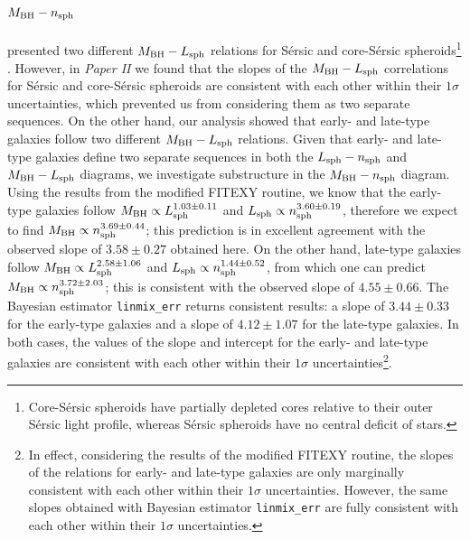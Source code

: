 \documentclass[preprint2]{emulateapj}
\begin{document}
\subsection{$M_{\rm BH} - n_{\rm sph}$}
\cite{grahamscott2013} presented two different $M_{\rm BH} - L_{\rm sph}$ relations for S\'ersic and core-S\'ersic 
spheroids\footnote{Core-S\'ersic spheroids have partially depleted cores relative to their outer S\'ersic light profile, 
whereas S\'ersic spheroids have no central deficit of stars. } \citep{graham2003coresersicmodel,trujillo2004coresersicmodel}.
However, in \emph{Paper II} we found that the slopes of the $M_{\rm BH} - L_{\rm sph}$ correlations for S\'ersic and core-S\'ersic spheroids 
are consistent with each other within their $1\sigma$ uncertainties, 
which prevented us from considering them as two separate sequences. 
On the other hand, our analysis showed that early- and late-type galaxies follow two different $M_{\rm BH} - L_{\rm sph}$ relations. 
Given that early- and late-type galaxies define two separate sequences in both the $L_{\rm sph} - n_{\rm sph}$ 
and $M_{\rm BH} - L_{\rm sph}$ diagrams, 
we investigate substructure in the $M_{\rm BH} - n_{\rm sph}$ diagram. 
Using the results from the modified FITEXY routine, 
we know that the early-type galaxies follow $M_{\rm BH} \propto L_{\rm sph}^{1.03 \pm 0.11}$ 
and $L_{\rm sph} \propto n_{\rm sph}^{3.60 \pm 0.19}$, 
therefore we expect to find $M_{\rm BH} \propto n_{\rm sph}^{3.69 \pm 0.44}$; 
this prediction is in excellent agreement with the observed slope of $3.58 \pm 0.27$ obtained here. 
On the other hand, late-type galaxies follow $M_{\rm BH} \propto L_{\rm sph}^{2.58 \pm 1.06}$ 
and $L_{\rm sph} \propto n_{\rm sph}^{1.44 \pm 0.52}$, 
from which one can predict $M_{\rm BH} \propto n_{\rm sph}^{3.72 \pm 2.03}$; 
this is consistent with the observed slope of $4.55 \pm 0.66$. 
The Bayesian estimator {\tt linmix\_err} returns consistent results: 
a slope of $3.44 \pm 0.33$ for the early-type galaxies 
and a slope of $4.12 \pm 1.07$ for the late-type galaxies. 
In both cases, the values of the slope and intercept for the early- and late-type galaxies 
are consistent with each other within their $1\sigma$ uncertainties\footnote{In effect, 
considering the results of the modified FITEXY routine, 
the slopes of the relations for early- and late-type galaxies 
are only marginally consistent with each other within their $1\sigma$ uncertainties. 
However, the same slopes obtained with Bayesian estimator {\tt linmix\_err} 
are fully consistent with each other within their $1\sigma$ uncertainties. }.
\end{document}
